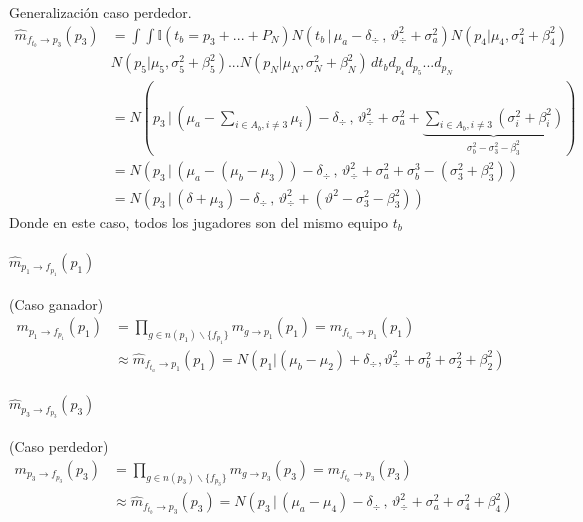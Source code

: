\documentclass[11pt,twoside,spanish]{report} %
\begin{document}
Generalizaci\'on caso perdedor.
\begin{equation}
	\begin{split}
		\widehat{m}_{f_{t_b} \rightarrow p_3}(p_3) &=\int \int \mathbb{I}(t_b = p_3+ ...+ P_N) N(t_b \, | \, \mu_a - \delta_{\div} \, , \, \vartheta_{\div}^2 + \sigma_a^2) N(p_4 | \mu_4 , \sigma_4^2 + \beta_4^2)\\
		&N(p_5 | \mu_5 , \sigma_5^2 + \beta_5^2)... N(p_N | \mu_N , \sigma_N^2 + \beta_N^2)  \, d{t_b} d_{p_4}d_{p_5}...d_{p_N} \\
		&= N( p_3 \,|\, (\mu_a  - \sum_{i \in A_b, i\neq3} \mu_i) - \delta_{\div}  \,,\,\vartheta_{\div}^2 + \sigma_a^2 +\underbrace{\sum_{i \in A_b, i\neq3} (\sigma_i^2 + \beta_i^2)}_{\sigma_b^2 - \sigma_3^2 - \beta_3^2} ) \\
		&= N( p_3 \,|\, (\mu_a  -  (\mu_b-\mu_3)) - \delta_{\div}  \,,\,\vartheta_{\div}^2 + \sigma_a^2 + \sigma_b^3 -(\sigma_3^2 + \beta_3^2) ) \\
		& = N( p_3 \,|\, (\delta + \mu_3) - \delta_{\div}  \,,\,\vartheta_{\div}^2 + (\vartheta^2 - \sigma_3^2 - \beta_3^2))
	\end{split}
\end{equation}
Donde en este caso, todos los jugadores son del mismo equipo $t_b$


\paragraph{$\widehat{m}_{p_1 \rightarrow f_{p_1}}(p_1)$} (Caso ganador)
\begin{equation}
	\begin{split}
		m_{ p_1\rightarrow f_{p_1}}(p_1) &=  \prod_{g \in n(p_1) \backslash  \{f_{p_1} \}} m_{g \rightarrow p_1} (p_1)= m_{f_{t_a} \rightarrow p_1}(p_1) \\
		&\approx \widehat{m}_{f_{t_a} \rightarrow p_1}(p_1) =  N( p_1 |  (\mu_b - \mu_2) + \delta_{\div} ,\vartheta_{\div}^2 + \sigma_b^2 + \sigma_2^2 + \beta_2^2)
	\end{split}
\end{equation}

\paragraph{$\widehat{m}_{p_3 \rightarrow f_{p_3}}(p_3)$} (Caso perdedor)
\begin{equation}
	\begin{split}
		m_{ p_3\rightarrow f_{p_3}}(p_3) &= \prod_{g \in n(p_3) \backslash  \{f_{p_3} \}} m_{g \rightarrow p_3} (p_3) = m_{f_{t_b} \rightarrow p_3}(p_3)\\
		&\approx \widehat{m}_{f_{t_b} \rightarrow p_3}(p_3)=  N( p_3 \,|\,  (\mu_a - \mu_4) - \delta_{\div}  \,,\,\vartheta_{\div}^2 + \sigma_a^2 + \sigma_4^2 + \beta_4^2)
	\end{split}
\end{equation}
\end{document}
